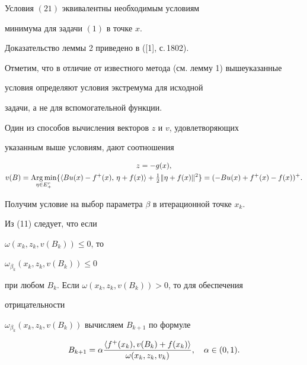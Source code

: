  


\begin{lem} Условия $(21)$ эквивалентны необходимым условиям 


минимума для задачи $(1)$ в точке $x$. 


\end{lem} 


 


Доказательство леммы 2 приведено в ([1], с.\,1802). 


 


Отметим, что в отличие от известного метода (см. лемму 1) вышеуказанные 


условия определяют условия экстремума для исходной 


задачи, а не для вспомогательной функции. 


 


Один из способов вычисления векторов $z$ и $v$, удовлетворяющих 


указанным выше условиям, дают соотношения 


\begin{gather} 


z=-g(x),\\ 


v(B)=\Argmin_{\eta\in E^r_+}\{\la B u(x)-f^+(x), 


\,\eta+f(x)\ra+\tfrac{1}{2}\|\eta+f(x)\|^2\}= 


(-B u(x)+f^+(x)-f(x))^+. 


\end{gather} 





Получим условие на выбор параметра $\beta$ в итерационной точке $x_k$. 


Из (11) следует, что если 


$\omega(x_k,z_k,v(B_k))\le 0$, то 


$\omega_{\beta_k}(x_k,z_k,v(B_k))\le 0$


при любом $B_k$. Если $\omega(x_k,z_k,v(B_k))>0$, то для обеспечения 


отрицательности 


$\omega_{\beta_k}(x_k,z_k,v(B_k))$ вычисляем $B_{k+1}$ по формуле 


\begin{equation} 


B_{k+1}=\alpha 


\frac{\la f^+(x_k),v(B_k)+f(x_k)\ra} 


{\omega(x_k,z_k,v_k)},\quad \alpha\in(0,1). 


\end{equation} 


